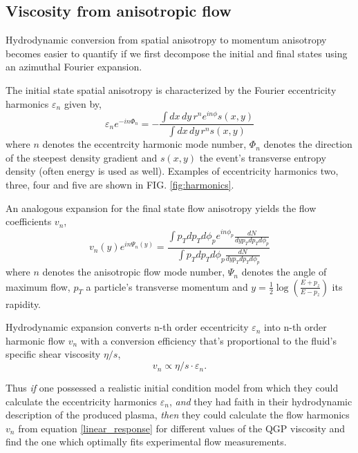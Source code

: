 \documentclass[aps,prc,reprint,amsmath,nofootinbib]{revtex4-1}
\begin{document}
\subsection{Viscosity from anisotropic flow}

Hydrodynamic conversion from spatial anisotropy to momentum anisotropy becomes easier to quantify if we first decompose the initial and final states using an azimuthal 
Fourier expansion. 

The initial state spatial anisotropy is characterized by the Fourier eccentricity harmonics $\varepsilon_n$ given by,
\begin{equation}
 \varepsilon_n e^{-i n \Phi_n} = -\frac{\int dx\,dy\,r^n e^{i n \phi} s(x,y)}{\int dx\,dy\, r^n s(x,y)}
\end{equation}
where $n$ denotes the eccentrcity harmonic mode number, $\Phi_n$ denotes the direction of the steepest density gradient and $s(x,y)$ the event's transverse entropy density
(often energy is used as well). Examples of eccentricity harmonics two, three, four and five are shown in FIG. \ref{fig:harmonics}.

An analogous expansion for the final state flow anisotropy yields the flow coefficients $v_n$,
\begin{equation}
 v_n(y) e^{i n \Psi_n(y)} = \frac{\int p_T dp_T d\phi_p e^{i n \phi_p} \frac{dN}{dy p_T dp_T d\phi_p}}{\int p_T dp_T d\phi_p \frac{dN}{dy p_T dp_T d\phi_p}}
\end{equation}
where $n$ denotes the anisotropic flow mode number, $\Psi_n$ denotes the angle of maximum flow, $p_T$ a particle's transverse momentum and 
$y=\tfrac{1}{2}\log(\tfrac{E+p_z}{E-p_z})$ its rapidity.

Hydrodynamic expansion converts n-th order eccentricity $\varepsilon_n$ into n-th order harmonic flow $v_n$ with a conversion efficiency that's proportional to the fluid's
specific shear viscosity $\eta/s$,
\begin{equation}
 \label{linear_response}
 v_n \propto \eta/s \cdot \varepsilon_n.
\end{equation}

Thus \emph{if} one possessed a realistic initial condition model from which they could calculate the eccentricity harmonics $\varepsilon_n$, \emph{and} they had faith 
in their hydrodynamic description of the produced plasma, \emph{then} they could calculate the flow harmonics $v_n$ from equation \ref{linear_response} for different values 
of the QGP viscosity and find the one which optimally fits experimental flow measurements.
\end{document}
